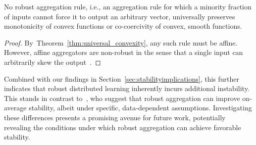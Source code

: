 \documentclass[twoside,11pt]{article}
\let\todo\relax%
\newcommand{\comm}[3][inline]{\todo[#1, size=\tiny]{#2: #3}}
\newcommand{\autodo}[2][inline]{\comm[color=green,#1]{AB}{#2}}
\begin{document}
\begin{corollary}\label{th:robust_against_cocoercivity}
    No robust aggregation rule, i.e.,  an aggregation rule for which a minority fraction of inputs cannot force it to output an arbitrary vector, universally preserves monotonicity of convex functions or co-coercivity of convex, smooth functions.
\end{corollary}
\begin{proof}
   By~Theorem~\ref{thm:universal_convexity}, any such rule must be affine. 
   However, affine aggregators are non-robust in the sense that a single input can arbitrarily skew the output~\cite[Lemma 1]{blanchard-ml-with-adversaries}. 
\end{proof}
Combined with our findings in Section~\ref{sec:stabilityimplications}, this further indicates that robust distributed learning inherently incurs additional instability. 
This stands in contrast to~\citet{iclr-2020-coherent-gradient}, who suggest that robust aggregation can improve on-average stability, albeit under specific, data-dependent assumptions. 
Investigating these differences presents a promising avenue for future work, potentially revealing the conditions under which robust aggregation can achieve favorable stability. 

\end{document}
